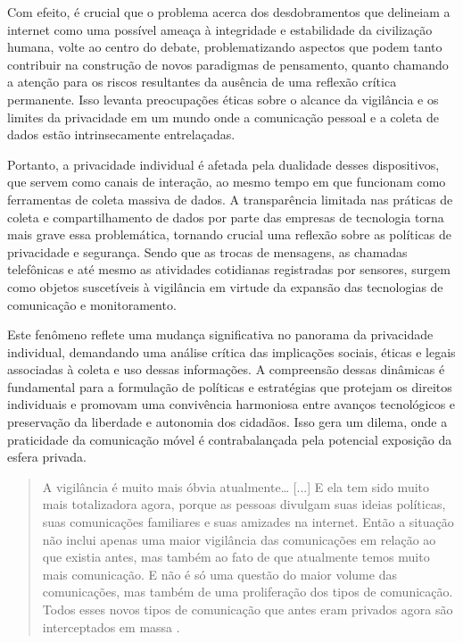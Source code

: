 \documentclass[portuguese]{textolivre}
\begin{document}
Com efeito, é crucial que o problema acerca dos desdobramentos que delineiam a internet como uma possível ameaça à integridade e estabilidade da civilização humana, volte ao centro do debate, problematizando aspectos que podem tanto contribuir na construção de novos paradigmas de pensamento, quanto chamando a atenção para os riscos resultantes da ausência de uma reflexão crítica permanente. Isso levanta preocupações éticas sobre o alcance da vigilância e os limites da privacidade em um mundo onde a comunicação pessoal e a coleta de dados estão intrinsecamente entrelaçadas.

Portanto, a privacidade individual é afetada pela dualidade desses dispositivos, que servem como canais de interação, ao mesmo tempo em que funcionam como ferramentas de coleta massiva de dados. A transparência limitada nas práticas de coleta e compartilhamento de dados por parte das empresas de tecnologia torna mais grave essa problemática, tornando crucial uma reflexão sobre as políticas de privacidade e segurança. Sendo que as trocas de mensagens, as chamadas telefônicas e até mesmo as atividades cotidianas registradas por sensores, surgem como objetos suscetíveis à vigilância em virtude da expansão das tecnologias de comunicação e monitoramento.

Este fenômeno reflete uma mudança significativa no panorama da privacidade individual, demandando uma análise crítica das implicações sociais, éticas e legais associadas à coleta e uso dessas informações. A compreensão dessas dinâmicas é fundamental para a formulação de políticas e estratégias que protejam os direitos individuais e promovam uma convivência harmoniosa entre avanços tecnológicos e preservação da liberdade e autonomia dos cidadãos. Isso gera um dilema, onde a praticidade da comunicação móvel é contrabalançada pela potencial exposição da esfera privada.
 
\begin{quote}
    A vigilância é muito mais óbvia atualmente… [...] E ela tem sido muito mais totalizadora agora, porque as pessoas divulgam suas ideias políticas, suas comunicações familiares e suas amizades na internet. Então a situação não inclui apenas uma maior vigilância das comunicações em relação ao que existia antes, mas também ao fato de que atualmente temos muito mais comunicação. E não é só uma questão do maior volume das comunicações, mas também de uma proliferação dos tipos de comunicação. Todos esses novos tipos de comunicação que antes eram privados agora são interceptados em massa \cite[p. 36]{assange_2013-1}.
\end{quote}
\end{document}
